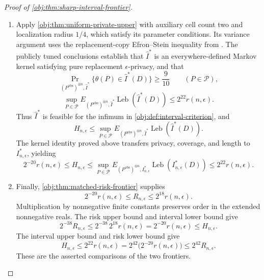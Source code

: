 \begin{proof}[Proof of \cref{obj:thm:sharp-interval-frontier}]
\begin{enumerate}
The numerical calibration is
\[
2^{-20}\le\frac{11}{20}\,2^{-14}.
\]
Multiplying by the nonnegative benchmark and using the separation bound gives
\[
2^{-20}r(n,\epsilon)
\le
\frac{11}{20}\,2^{-14}r(n,\epsilon)
\le
\frac{11}{20}\Delta
\le
\sup_{P\in\mathcal P}
E_{(P^{\mathrm{obs}})^{\otimes n},I}
\operatorname{Leb}(I(D)).
\]
Since this holds for every feasible \(I\), taking the defining infimum proves
\[
2^{-20}r(n,\epsilon)\le H_{n,\epsilon}.
\]

\item Apply \cref{obj:thm:uniform-private-upper} with auxiliary cell count two and localization radius \(1/4\), which satisfy its parameter conditions. Its variance argument uses the replacement-copy Efron--Stein inequality from
\citep[Theorem 3.1, printed p.~54]{BoucheronLugosiMassart2013}.
The publicly tuned conclusions establish that \(\widehat I^*\) is an everywhere-defined Markov kernel satisfying pure replacement \(\epsilon\)-privacy, and that
\[
\Pr_{(P^{\mathrm{obs}})^{\otimes n},\widehat I^*}
\{\theta(P)\in\widehat I^*(D)\}
\ge\frac9{10}
\qquad(P\in\mathcal P),
\]
\[
\sup_{P\in\mathcal P}
E_{(P^{\mathrm{obs}})^{\otimes n},\widehat I^*}
\operatorname{Leb}(\widehat I^*(D))
\le2^{22}r(n,\epsilon).
\]
Thus \(\widehat I^*\) is feasible for the infimum in
\cref{obj:def:interval-criterion}, and
\[
H_{n,\epsilon}
\le
\sup_{P\in\mathcal P}
E_{(P^{\mathrm{obs}})^{\otimes n},\widehat I^*}
\operatorname{Leb}(\widehat I^*(D)).
\]
The kernel identity proved above transfers privacy, coverage, and length to \(I^*_{n,\epsilon}\), yielding
\[
2^{-20}r(n,\epsilon)
\le H_{n,\epsilon}
\le
\sup_{P\in\mathcal P}
E_{(P^{\mathrm{obs}})^{\otimes n},I^*_{n,\epsilon}}
\operatorname{Leb}(I^*_{n,\epsilon}(D))
\le2^{22}r(n,\epsilon).
\]

\item Finally, \cref{obj:thm:matched-risk-frontier} supplies
\[
2^{-20}r(n,\epsilon)
\le R_{n,\epsilon}
\le2^{18}r(n,\epsilon).
\]
Multiplication by nonnegative finite constants preserves order in the extended nonnegative reals. The risk upper bound and interval lower bound give
\[
2^{-38}R_{n,\epsilon}
\le
2^{-38}\,2^{18}r(n,\epsilon)
=
2^{-20}r(n,\epsilon)
\le H_{n,\epsilon}.
\]
The interval upper bound and risk lower bound give
\[
H_{n,\epsilon}
\le2^{22}r(n,\epsilon)
=
2^{42}\bigl(2^{-20}r(n,\epsilon)\bigr)
\le2^{42}R_{n,\epsilon}.
\]
These are the asserted comparisons of the two frontiers.
\end{enumerate}
\end{proof}

